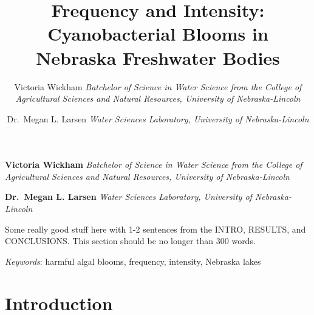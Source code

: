 \documentclass[11pt,]{article}
\title{Frequency and Intensity: Cyanobacterial Blooms in Nebraska Freshwater Bodies  }
\author{\Large Victoria Wickham\vspace{0.05in} \newline\normalsize\emph{Batchelor of Science in Water Science from the College of Agricultural
Sciences and Natural Resources, University of Nebraska-Lincoln}   \and \Large Dr.~Megan L. Larsen\vspace{0.05in} \newline\normalsize\emph{Water Sciences Laboratory, University of Nebraska-Lincoln}  }
\date{}
\newcommand*{\authorfont}{\fontfamily{phv}\selectfont}
\renewenvironment{abstract}
 {{%
    \setlength{\leftmargin}{0mm}
    \setlength{\rightmargin}{\leftmargin}%
  }%
  \relax}
 {\endlist}
\begin{document}
	
%

{%
\setlength{\parindent}{0pt}
\thispagestyle{plain}
{\fontsize{18}{20}\selectfont\raggedright 
\maketitle  %

}

{
   \vskip 13.5pt\relax \normalsize\fontsize{11}{12} 
\textbf{\authorfont Victoria Wickham} \hskip 15pt \emph{\small Batchelor of Science in Water Science from the College of Agricultural
Sciences and Natural Resources, University of Nebraska-Lincoln}   \par \textbf{\authorfont Dr.~Megan L. Larsen} \hskip 15pt \emph{\small Water Sciences Laboratory, University of Nebraska-Lincoln}   

}

}







\begin{abstract}

    \hbox{\vrule height .2pt width 39.14pc}

    \vskip 8.5pt %

\noindent Some really good stuff here with 1-2 sentences from the INTRO, RESULTS,
and CONCLUSIONS. This section should be no longer than 300 words.


\vskip 8.5pt \noindent \emph{Keywords}: harmful algal blooms, frequency, intensity, Nebraska lakes \par

    \hbox{\vrule height .2pt width 39.14pc}



\end{abstract}


\vskip 6.5pt

\noindent   \clearpage
\tableofcontents  \newpage
\listoftables  \newpage
\listoffigures  \newpage

\section{Introduction}\label{introduction}
\end{document}
